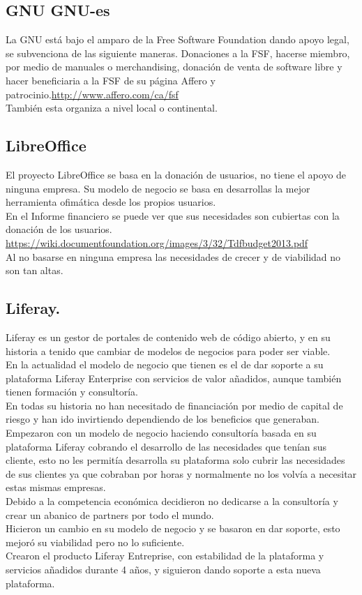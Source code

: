 \documentclass[12pt]{article} %
\begin{document}
\subsection{GNU GNU-es} %
La GNU está bajo el amparo de la Free Software Foundation dando apoyo legal, se subvenciona de las siguiente maneras. Donaciones a la FSF, hacerse miembro, por medio de manuales o merchandising, donación de venta de software libre y hacer beneficiaria a la FSF de su página Affero y patrocinio.\url{http://www.affero.com/ca/fsf}\\También esta organiza a nivel local o continental.

\subsection{LibreOffice} %

El proyecto LibreOffice se basa en la donación de usuarios, no tiene el apoyo de ninguna empresa. Su modelo de negocio se basa en desarrollas la mejor herramienta ofimática desde los propios usuarios. \\En el Informe financiero se puede ver que sus necesidades son cubiertas con la donación de los usuarios. \url {https://wiki.documentfoundation.org/images/3/32/Tdfbudget2013.pdf}\\Al no basarse en ninguna empresa las necesidades de crecer y de viabilidad no son tan altas. 


\subsection{Liferay.} %

Liferay es un gestor de portales de contenido web de código abierto, y en su historia a tenido que cambiar de modelos de negocios para poder ser viable.\\En la actualidad el modelo de negocio que tienen es el de dar soporte a su plataforma Liferay Enterprise con servicios de valor añadidos, aunque también tienen formación y consultoría.\\En todas su historia no han necesitado de financiación por medio de capital de riesgo y han ido invirtiendo dependiendo de los beneficios que generaban.\\Empezaron con un modelo de negocio haciendo consultoría basada en su plataforma Liferay cobrando el desarrollo de las necesidades que tenían sus cliente, esto no les permitía desarrolla su plataforma solo cubrir las necesidades de sus clientes ya que cobraban por horas y normalmente no los volvía a necesitar estas mismas empresas.\\ Debido a la competencia económica decidieron no dedicarse a la consultoría y crear un abanico de partners por todo el mundo.\\Hicieron un cambio en su modelo de negocio y se basaron en dar soporte, esto mejoró su viabilidad pero no lo suficiente.
\\Crearon el producto Liferay Entreprise, con estabilidad de la plataforma y servicios añadidos durante 4 años, y siguieron dando soporte a esta nueva plataforma.
\end{document}
